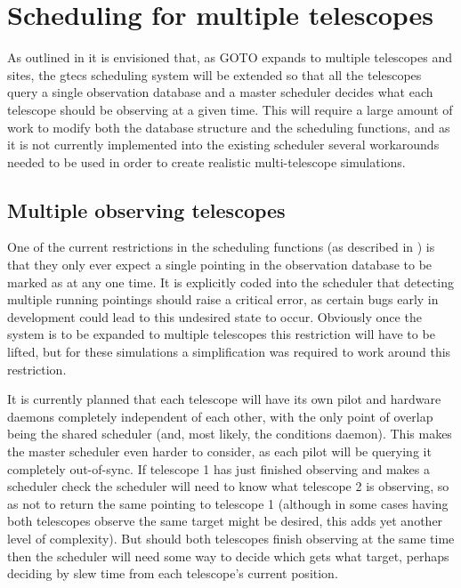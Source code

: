 \section{Scheduling for multiple telescopes}
\label{sec:multi_tel}
\begin{colsection}


\begin{colsection}


As outlined in  it is envisioned that, as GOTO expands to multiple telescopes and sites, the \gls{gtecs} scheduling system will be extended so that all the telescopes query a single observation database and a master scheduler decides what each telescope should be observing at a given time. This will require a large amount of work to modify both the database structure and the scheduling functions, and as it is not currently implemented into the existing scheduler several workarounds needed to be used in order to create realistic multi-telescope simulations.

\end{colsection}


\subsection{Multiple observing telescopes}
\label{sec:multi_tel_scheduling}
\begin{colsection}

One of the current restrictions in the scheduling functions (as described in ) is that they only ever expect a single pointing in the observation database to be marked as  at any one time. It is explicitly coded into the scheduler that detecting multiple running pointings should raise a critical error, as certain bugs early in development could lead to this undesired state to occur. Obviously once the system is to be expanded to multiple telescopes this restriction will have to be lifted, but for these simulations a simplification was required to work around this restriction.

It is currently planned that each telescope will have its own pilot and hardware daemons completely independent of each other, with the only point of overlap being the shared scheduler (and, most likely, the conditions daemon). This makes the master scheduler even harder to consider, as each pilot will be querying it completely out-of-sync. If telescope 1 has just finished observing and makes a scheduler check the scheduler will need to know what telescope 2 is observing, so as not to return the same pointing to telescope 1 (although in some cases having both telescopes observe the same target might be desired, this adds yet another level of complexity). But should both telescopes finish observing at the same time then the scheduler will need some way to decide which gets what target, perhaps deciding by slew time from each telescope's current position.


\end{colsection}
\end{colsection}
